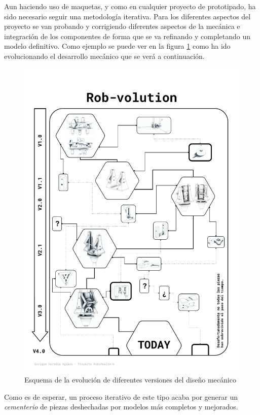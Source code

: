 Aun haciendo uso de maquetas, y como en cualquier proyecto de prototipado, ha sido necesario seguir una metodología iterativa. Para los diferentes aspectos del proyecto se van probando y corrigiendo diferentes aspectos de la mecánica e integración de los componentes de forma que se va refinando y completando un modelo definitivo. Como ejemplo se puede ver en la figura \ref{fig:PuntoPartida:rovbolution} como ha ido evolucionando el desarrollo mecánico que se verá a continuación.
\\


\begin{figure}[H]
    \vspace{-1cm}
    \begin{adjustwidth}{-1.9cm}{-1.5cm}
       \centering
       \includegraphics[width=1.1\textwidth]{figuras/Imagenes_PuntoPartida/Rob-volution.pdf}
       \caption{Esquema de la evolución de diferentes versiones del diseño mecánico}
       \label{fig:PuntoPartida:rovbolution}
   \end{adjustwidth}
\end{figure}

Como es de esperar, un proceso iterativo de este tipo acaba por generar un \textit{cementerio} de piezas deshechadas por modelos más completos y mejorados.


%
